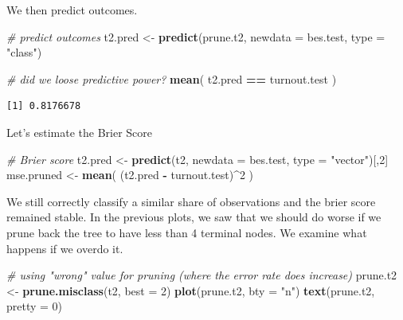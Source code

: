 \documentclass[]{article}
\newenvironment{Shaded}{\begin{snugshade}}{\end{snugshade}}
\newcommand{\CommentTok}[1]{\textcolor[rgb]{0.56,0.35,0.01}{\textit{#1}}}
\newcommand{\DataTypeTok}[1]{\textcolor[rgb]{0.13,0.29,0.53}{#1}}
\newcommand{\DecValTok}[1]{\textcolor[rgb]{0.00,0.00,0.81}{#1}}
\newcommand{\KeywordTok}[1]{\textcolor[rgb]{0.13,0.29,0.53}{\textbf{#1}}}
\newcommand{\NormalTok}[1]{#1}
\newcommand{\OperatorTok}[1]{\textcolor[rgb]{0.81,0.36,0.00}{\textbf{#1}}}
\newcommand{\StringTok}[1]{\textcolor[rgb]{0.31,0.60,0.02}{#1}}
\begin{document}
We then predict outcomes.

\begin{Shaded}
\begin{Highlighting}[]
\CommentTok{# predict outcomes}
\NormalTok{t2.pred <-}\StringTok{ }\KeywordTok{predict}\NormalTok{(prune.t2, }\DataTypeTok{newdata =}\NormalTok{ bes.test, }\DataTypeTok{type =} \StringTok{"class"}\NormalTok{)}

\CommentTok{# did we loose predictive power?}
\KeywordTok{mean}\NormalTok{( t2.pred }\OperatorTok{==}\StringTok{ }\NormalTok{turnout.test )}
\end{Highlighting}
\end{Shaded}

\begin{verbatim}
[1] 0.8176678
\end{verbatim}

Let's estimate the Brier Score

\begin{Shaded}
\begin{Highlighting}[]
\CommentTok{# Brier score}
\NormalTok{t2.pred <-}\StringTok{ }\KeywordTok{predict}\NormalTok{(t2, }\DataTypeTok{newdata =}\NormalTok{ bes.test, }\DataTypeTok{type =} \StringTok{"vector"}\NormalTok{)[,}\DecValTok{2}\NormalTok{]}
\NormalTok{mse.pruned <-}\StringTok{ }\KeywordTok{mean}\NormalTok{( (t2.pred }\OperatorTok{-}\StringTok{ }\NormalTok{turnout.test)}\OperatorTok{^}\DecValTok{2}\NormalTok{ ) }
\end{Highlighting}
\end{Shaded}

We still correctly classify a similar share of observations and the brier score remained stable. In the previous plots, we saw that we should do worse if we prune back the tree to have less than 4 terminal nodes. We examine what happens if we overdo it.

\begin{Shaded}
\begin{Highlighting}[]
\CommentTok{# using "wrong" value for pruning (where the error rate does increase)}
\NormalTok{prune.t2 <-}\StringTok{ }\KeywordTok{prune.misclass}\NormalTok{(t2, }\DataTypeTok{best =} \DecValTok{2}\NormalTok{)}
\KeywordTok{plot}\NormalTok{(prune.t2, }\DataTypeTok{bty =} \StringTok{"n"}\NormalTok{)}
\KeywordTok{text}\NormalTok{(prune.t2, }\DataTypeTok{pretty =} \DecValTok{0}\NormalTok{)}
\end{Highlighting}
\end{Shaded}
\end{document}
